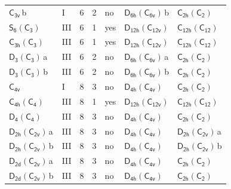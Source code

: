 \documentclass[10pt,a4paper]{article}
\numberwithin{equation}{section}
\newcommand{\grp}[1]{\mathsf{#1}}
\newcommand{\clsletter}[1]{\,{\scriptsize\color{black!55}#1}}
\begin{document}
{\begin{longtable}{@{}llrrlll@{}}
\href{../../../rotation/data/pdf/C3v.pdf}{$\grp{C_{3v}}$}\clsletter{b} & I & 6 & 2 & no & \href{D6h-C6v.pdf}{$\grp{D_{6h}}(\grp{C_{6v}})$}\clsletter{b} & \href{C2h-C2.pdf}{$\grp{C_{2h}}(\grp{C_{2}})$}\\
\href{S6-C3.pdf}{$\grp{S_{6}}(\grp{C_{3}})$} & III & 6 & 1 & yes & \href{D12h-C12v.pdf}{$\grp{D_{12h}}(\grp{C_{12v}})$} & \href{C12h-C12.pdf}{$\grp{C_{12h}}(\grp{C_{12}})$}\\
\href{C3h-C3.pdf}{$\grp{C_{3h}}(\grp{C_{3}})$} & III & 6 & 1 & yes & \href{D12h-C12v.pdf}{$\grp{D_{12h}}(\grp{C_{12v}})$} & \href{C12h-C12.pdf}{$\grp{C_{12h}}(\grp{C_{12}})$}\\
\href{D3-C3.pdf}{$\grp{D_{3}}(\grp{C_{3}})$}\clsletter{a} & III & 6 & 2 & no & \href{D6h-C6v.pdf}{$\grp{D_{6h}}(\grp{C_{6v}})$}\clsletter{a} & \href{C2h-C2.pdf}{$\grp{C_{2h}}(\grp{C_{2}})$}\\
\href{D3-C3.pdf}{$\grp{D_{3}}(\grp{C_{3}})$}\clsletter{b} & III & 6 & 2 & no & \href{D6h-C6v.pdf}{$\grp{D_{6h}}(\grp{C_{6v}})$}\clsletter{b} & \href{C2h-C2.pdf}{$\grp{C_{2h}}(\grp{C_{2}})$}\\
\href{../../../rotation/data/pdf/C4v.pdf}{$\grp{C_{4v}}$} & I & 8 & 3 & no & \href{D4h-C4v.pdf}{$\grp{D_{4h}}(\grp{C_{4v}})$} & \href{C2h-C2.pdf}{$\grp{C_{2h}}(\grp{C_{2}})$}\\
\href{C4h-C4.pdf}{$\grp{C_{4h}}(\grp{C_{4}})$} & III & 8 & 1 & yes & \href{D12h-C12v.pdf}{$\grp{D_{12h}}(\grp{C_{12v}})$} & \href{C12h-C12.pdf}{$\grp{C_{12h}}(\grp{C_{12}})$}\\
\href{D4-C4.pdf}{$\grp{D_{4}}(\grp{C_{4}})$} & III & 8 & 3 & no & \href{D4h-C4v.pdf}{$\grp{D_{4h}}(\grp{C_{4v}})$} & \href{C2h-C2.pdf}{$\grp{C_{2h}}(\grp{C_{2}})$}\\
\href{D2h-C2v.pdf}{$\grp{D_{2h}}(\grp{C_{2v}})$}\clsletter{a} & III & 8 & 3 & no & \href{D4h-C4v.pdf}{$\grp{D_{4h}}(\grp{C_{4v}})$} & \href{D2h-C2v.pdf}{$\grp{D_{2h}}(\grp{C_{2v}})$}\clsletter{a}\\
\href{D2h-C2v.pdf}{$\grp{D_{2h}}(\grp{C_{2v}})$}\clsletter{b} & III & 8 & 3 & no & \href{D4h-C4v.pdf}{$\grp{D_{4h}}(\grp{C_{4v}})$} & \href{D2h-C2v.pdf}{$\grp{D_{2h}}(\grp{C_{2v}})$}\clsletter{b}\\
\href{D2d-C2v.pdf}{$\grp{D_{2d}}(\grp{C_{2v}})$}\clsletter{a} & III & 8 & 3 & no & \href{D4h-C4v.pdf}{$\grp{D_{4h}}(\grp{C_{4v}})$} & \href{C2h-C2.pdf}{$\grp{C_{2h}}(\grp{C_{2}})$}\\
\href{D2d-C2v.pdf}{$\grp{D_{2d}}(\grp{C_{2v}})$}\clsletter{b} & III & 8 & 3 & no & \href{D4h-C4v.pdf}{$\grp{D_{4h}}(\grp{C_{4v}})$} & \href{C2h-C2.pdf}{$\grp{C_{2h}}(\grp{C_{2}})$}\\

\end{longtable}}
\end{document}
